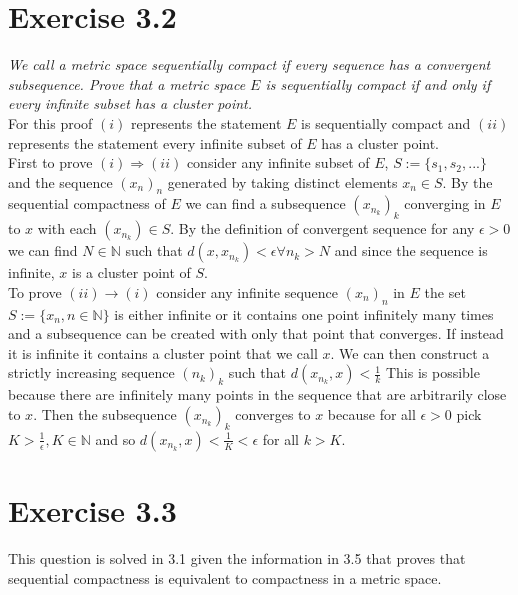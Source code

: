 \documentclass{amsart}
\begin{document}
    \section*{Exercise 3.2}
        \emph{We call a metric space sequentially compact if every sequence has a
    convergent subsequence. Prove that a metric space $E$ is sequentially compact if and only if
    every infinite subset has a cluster point.}\\
        For this proof $(i)$ represents the statement $E$ is sequentially compact and $(ii)$ represents the statement
        every infinite subset of  $E$ has a cluster point.
        \\
        First to prove $(i) \Rightarrow (ii)$ consider any infinite subset of $E$, $S := \{s_1,s_2,...\}$
        and the sequence $(x_n)_n$ generated by taking distinct elements $x_n \in S$.
        By the sequential compactness of $E$ we can find a subsequence $(x_{n_k})_k$ converging in $E$ to $x$ with each $(x_{n_k}) \in S$.
        By the definition of convergent sequence for any $\epsilon > 0$ we can find $N \in \mathbb{N} $ such that $d(x,x_{n_k}) < \epsilon \forall n_k > N$ and since the sequence is
        infinite, $x$ is a cluster point of $S$.\\
        To prove $(ii) \rightarrow (i)$ consider any infinite sequence $(x_n)_n$ in $E$ the set $S := \{x_n, n\in \mathbb{N} \}$ is either infinite or it contains one point infinitely many times and a subsequence can be created with only that point that converges. If instead it is infinite it contains a cluster point that we call $x$.
        We can then construct a strictly increasing sequence $(n_k)_k$ such that $d(x_{n_k}, x) < \frac{1}{k}$ This is possible because there are infinitely many points in the sequence that are arbitrarily close to $x$.
    Then the subsequence $(x_{n_k})_k$ converges to  $x$ because for all $\epsilon > 0$ pick $K > \frac{1}{\epsilon }, K \in \mathbb{N} $ and so $d(x_{n_k}, x) < \frac{1}{K} < \epsilon $ for all $k > K$.

    \section{Exercise 3.3}
    This question is solved in 3.1 given the information in 3.5 that proves that sequential compactness is equivalent to compactness in a metric space.
\end{document}
